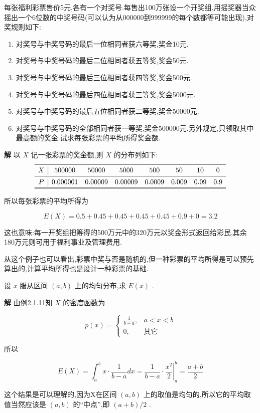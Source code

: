 \begin{example}
	每张福利彩票售价5元,各有一个对奖号.每售出100万张设一个开奖组,用摇奖器当众摇出一个6位数的中奖号码(可以认为从000000到999999的每个数都等可能出现),对奖规则如下:
	\begin{enumerate}
		\item 对奖号与中奖号码的最后一位相同者获六等奖,奖金10元.
		\item 对奖号与中奖号码的最后二位相同者获五等奖,奖金50元.
		\item 对奖号与中奖号码的最后三位相同者获四等奖,奖金500元.
		\item 对奖号与中奖号码的最后四位相同者获三等奖,奖金5000元.
		\item 对奖号与中奖号码的最后五位相同者获二等奖,奖金50000元.
		\item 对奖号与中奖号码的全部相同者获一等奖,奖金500000元.另外规定,只领取其中最高额的奖金.试求每张彩票的平均所得奖金额.
	\end{enumerate}
	
	\textbf{解} 以 $ X $ 记一张彩票的奖金额,则 $ X $ 的分布列如下:
	\[
	\begin{array}{c|ccccccc}
	\toprule
	X     & 500000 & 50000 & 5000  & 500   & 50    & 10    & 0 \\\midrule
	P     & 0.000001 & 0.00009 & 0.00009 & 0.0009 & 0.009 & 0.09  & 0.9 \\\bottomrule
	\end{array}
	\]
	
	
	所以每张彩票的平均所得为
	
	\[ 
	E(X)=0.5+0.45+0.45+0.45+0.45+0.9+0=3.2
	\]
	
	这也意味:每一开奖组把筹得的500万元中的320万元以奖金形式返回给彩民,其余180万元则可用于福利事业及管理费用.
	
	从这个例子也可以看出,彩票中奖与否是随机的,但一种彩票的平均所得是可以预先算出的,计算平均所得也是设计一种彩票的基础.
	
\end{example}

\begin{example}
	设 $ x $ 服从区间 $ (a,b) $ 上的均匀分布,求 $ E(x) $ .
	
	\textbf{解} 由例2.1.11知 $ X $ 的密度函数为
	
	\[ 
	p(x)=\left\{\begin{array}{ll}
	{\frac{1}{b-a}, }&{a<x<b} \\ {0,}&{\text{其它}}
	\end{array}\right.
	\]
	
	所以
	
	\[ 
	E(X)=\int_{a}^{b} x \cdot \frac{1}{b-a} d x=\frac{1}{b-a} \cdot\left.\frac{x^{2}}{2}\right|_{a} ^{b}=\frac{a+b}{2}
	\]
	
	这个结果是可以理解的,因为X在区间 $ (a,b) $ 上的取值是均匀的,所以它的平均取值当然应该是 $ (a,b) $ 的“中点”,即 $ (a+b)/2 $ .
	
	
\end{example}

